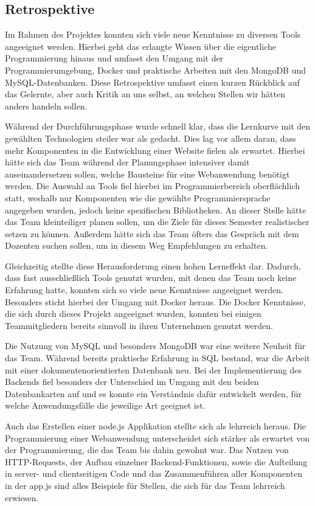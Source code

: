 \subsection{Retrospektive}\label{subsec:retrospektive}

Im Rahmen des Projektes konnten sich viele neue Kenntnisse zu diversen Tools angeeignet werden.
Hierbei geht das erlangte Wissen über die eigentliche Programmierung hinaus und umfasst den Umgang mit der Programmierumgebung, Docker und praktische Arbeiten mit den MongoDB und MySQL-Datenbanken.
Diese Retrospektive umfasst einen kurzen Rückblick auf das Gelernte, aber auch Kritik an uns selbst, an welchen Stellen wir hätten anders handeln sollen.

Während der Durchführungsphase wurde schnell klar, dass die Lernkurve mit den gewählten Technologien steiler war als gedacht.
Dies lag vor allem daran, dass mehr Komponenten in die Entwicklung einer Website fielen als erwartet.
Hierbei hätte sich das Team während der Planungsphase intensiver damit auseinandersetzen sollen, welche Bausteine für eine Webanwendung benötigt werden.
Die Auswahl an Tools fiel hierbei im Programmierbereich oberflächlich statt, weshalb nur Komponenten wie die gewählte Programmiersprache angegeben wurden, jedoch keine spezifischen Bibliotheken.
An dieser Stelle hätte das Team kleinteiliger planen sollen, um die Ziele für dieses Semester realistischer setzen zu können.
Außerdem hätte sich das Team öfters das Gespräch mit dem Dozenten suchen sollen, um in diesem Weg Empfehlungen zu erhalten.

Gleichzeitig stellte diese Herausforderung einen hohen Lerneffekt dar.
Dadurch, dass fast ausschließlich Tools genutzt wurden, mit denen das Team noch keine Erfahrung hatte, konnten sich so viele neue Kenntnisse angeeignet werden.
Besonders sticht hierbei der Umgang mit Docker heraus.
Die Docker Kenntnisse, die sich durch dieses Projekt angeeignet wurden, konnten bei einigen Teammitgliedern bereits sinnvoll in ihren Unternehmen genutzt werden.

Die Nutzung von MySQL und besonders MongoDB war eine weitere Neuheit für das Team.
Während bereits praktische Erfahrung in SQL bestand, war die Arbeit mit einer dokumentenorientierten Datenbank neu.
Bei der Implementierung des Backends fiel besonders der Unterschied im Umgang mit den beiden Datenbankarten auf und es konnte ein Verständnis dafür entwickelt werden, für welche Anwendungsfälle die jeweilige Art geeignet ist.

Auch das Erstellen einer node.js Applikation stellte sich als lehrreich heraus.
Die Programmierung einer Webanwendung unterscheidet sich stärker als erwartet von der Programmierung, die das Team bis dahin gewohnt war.
Das Nutzen von HTTP-Requests, der Aufbau einzelner Backend-Funktionen, sowie die Aufteilung in server- und clientseitigen Code und das Zusammenführen aller Komponenten in der app.js sind alles Beispiele für Stellen, die sich für das Team lehrreich erwiesen.

